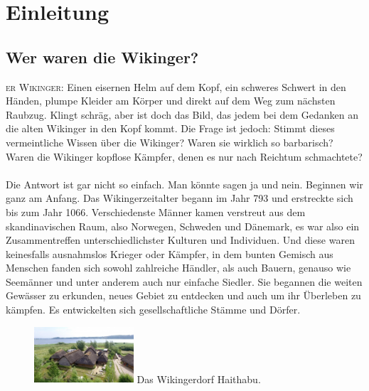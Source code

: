 \documentclass[12pt,a4paper,ngerman,openany]{book}
\newcommand{\flettrine}[2]{\lettrine[lines=2, depth=0, loversize=0.25, nindent=0.69pt, lraise=0.15]{\initfamily{#1}}{#2}}
\newcommand*\initfamily{\usefont{U}{GotIn}{xl}{n}}
\newcommand\blankpage{\null \thispagestyle{empty} \addtocounter{page}{-1} \newpage}
\newcommand{\fchapter}[1]{\chapter{#1}\thispagestyle{chapterstyle}}
\begin{document}

\thispagestyle{empty}
\newpage

\afterpage{\blankpage}
\tableofcontents
\thispagestyle{empty}


\fchapter{Einleitung}

\section{Wer waren die Wikinger?}

\flettrine{D}{er Wikinger:} Einen eisernen Helm auf dem Kopf, ein schweres Schwert in den Händen, plumpe Kleider am Körper und direkt auf dem Weg zum nächsten Raubzug.
Klingt schräg, aber ist doch das Bild, das jedem bei dem Gedanken an die alten Wikinger in den Kopf kommt. Die Frage ist jedoch: Stimmt dieses vermeintliche Wissen über die Wikinger?
Waren sie wirklich so barbarisch? Waren die Wikinger kopflose Kämpfer, denen es nur nach Reichtum schmachtete?\\\\
Die Antwort ist gar nicht so einfach. Man könnte sagen ja und nein. Beginnen wir ganz am Anfang. Das Wikingerzeitalter begann im Jahr 793 und erstreckte sich bis zum Jahr 1066.
Verschiedenste Männer kamen verstreut aus dem skandinavischen Raum, also Norwegen, Schweden und Dänemark, es war also ein Zusammentreffen unterschiedlichster Kulturen und Individuen.
Und diese waren keinesfalls ausnahmslos Krieger oder Kämpfer, in dem bunten Gemisch aus Menschen fanden sich sowohl zahlreiche Händler, als auch Bauern, genauso wie Seemänner und unter anderem auch nur einfache Siedler.
Sie begannen die weiten Gewässer zu erkunden, neues Gebiet zu entdecken und auch um ihr Überleben zu kämpfen. Es entwickelten sich gesellschaftliche Stämme und Dörfer.

\begin{figure}
  \centering
  \includegraphics[width=0.33\textwidth]{haithabu.jpg}
  Das Wikingerdorf Haithabu.
\end{figure}
\end{document}
